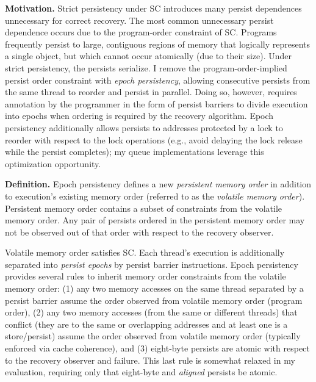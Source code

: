 \textbf{Motivation.}
Strict persistency under SC introduces many persist dependences unnecessary for correct recovery.
The most common unnecessary persist dependence occurs due to the program-order constraint of SC.
Programs frequently persist to large, contiguous regions of memory that logically represents a single object, but which cannot occur atomically (due to their size).
Under strict persistency, the persists serialize.
I remove the program-order-implied persist order constraint with \emph{epoch persistency}, allowing consecutive persists from the same thread to reorder and persist in parallel.
Doing so, however, requires annotation by the programmer in the form of persist barriers to divide execution into epochs when ordering is required by the recovery algorithm.
Epoch persistency additionally allows persists to addresses protected by a lock to reorder with respect to the lock operations (e.g., avoid delaying the lock release while the persist completes); my queue implementations leverage this optimization opportunity.

\textbf{Definition.}
Epoch persistency defines a new \emph{persistent memory order} in addition to execution's existing memory order (referred to as the \emph{volatile memory order}).
Persistent memory order contains a subset of constraints from the volatile memory order.
Any pair of persists ordered in the persistent memory order may not be observed out of that order with respect to the recovery observer.

Volatile memory order satisfies SC.
Each thread's execution is additionally separated into \emph{persist epochs} by persist barrier instructions.
Epoch persistency provides several rules to inherit memory order constraints from the volatile memory order: (1) any two memory accesses on the same thread separated by a persist barrier assume the order observed from volatile memory order (program order), (2) any two memory accesses (from the same or different threads) that conflict (they are to the same or overlapping addresses and at least one is a store/persist) assume the order observed from volatile memory order (typically enforced via cache coherence), and (3) eight-byte persists are atomic with respect to the recovery observer and failure.
This last rule is somewhat relaxed in my evaluation, requiring only that eight-byte and \emph{aligned} persists be atomic.

